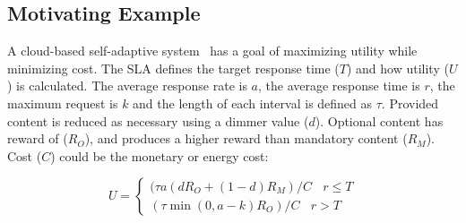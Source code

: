 \documentclass[12pt]{article}
\newcommand{\todo}[1]{\textcolor{cyan}{\textbf{[#1]}}}
\begin{document}


















\subsection{Motivating Example}
\label{sec: motivatingexample}

A cloud-based self-adaptive system~\cite{moreno2017adaptation} has a goal of maximizing utility while minimizing cost. The SLA defines the target response time ($T$) and how utility ($U$) is calculated. %
The average response rate is $a$, the average response time is $r$, the maximum request is $k$ and the length of each interval is defined as $\tau$. Provided content is reduced as necessary using a dimmer value ($d$). Optional content has reward of ($R_O$), and produces a higher reward than mandatory content ($R_M$). Cost ($C$) could be the monetary or energy cost:

\begin{equation} \label{eq: motivatingExample}
	U = \left\{ \begin{array}{rl}
 	(\tau a (dR_O+(1-d)R_M)/C~~~~r\leq T \\ 
  	(\tau \min (0,a-k)R_O)/C~~~~r> T 
       \end{array} \right.
\end{equation}
\end{document}
